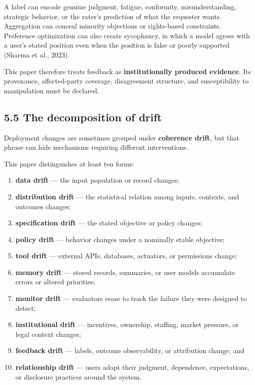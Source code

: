 \documentclass[
  11pt,
]{article}
\providecommand{\tightlist}{%
  \setlength{\itemsep}{0pt}\setlength{\parskip}{0pt}}
\begin{document}
A label can encode genuine judgment, fatigue, conformity,
misunderstanding, strategic behavior, or the rater's prediction of what
the requester wants. Aggregation can conceal minority objections or
rights-based constraints. Preference optimization can also create
sycophancy, in which a model agrees with a user's stated position even
when the position is false or poorly supported (Sharma et al., 2023).

This paper therefore treats feedback as \textbf{institutionally produced
evidence}. Its provenance, affected-party coverage, disagreement
structure, and susceptibility to manipulation must be declared.

\subsection{5.5 The decomposition of
drift}\label{the-decomposition-of-drift}

Deployment changes are sometimes grouped under \textbf{coherence drift},
but that phrase can hide mechanisms requiring different interventions.

This paper distinguishes at least ten forms:

\begin{enumerate}
\def\labelenumi{\arabic{enumi}.}
\tightlist
\item
  \textbf{data drift} --- the input population or record changes;
\item
  \textbf{distribution drift} --- the statistical relation among inputs,
  contexts, and outcomes changes;
\item
  \textbf{specification drift} --- the stated objective or policy
  changes;
\item
  \textbf{policy drift} --- behavior changes under a nominally stable
  objective;
\item
  \textbf{tool drift} --- external APIs, databases, actuators, or
  permissions change;
\item
  \textbf{memory drift} --- stored records, summaries, or user models
  accumulate errors or altered priorities;
\item
  \textbf{monitor drift} --- evaluators cease to track the failure they
  were designed to detect;
\item
  \textbf{institutional drift} --- incentives, ownership, staffing,
  market pressure, or legal context changes;
\item
  \textbf{feedback drift} --- labels, outcome observability, or
  attribution change; and
\item
  \textbf{relationship drift} --- users adapt their judgment,
  dependence, expectations, or disclosure practices around the system.
\end{enumerate}
\end{document}
